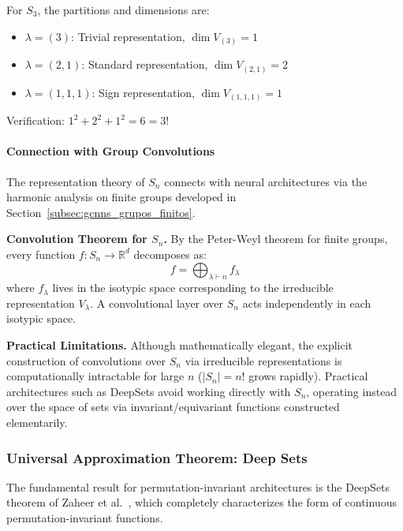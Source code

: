 \begin{example}[Dimensions for $n=3$]
For $S_3$, the partitions and dimensions are:
\begin{itemize}
    \item $\lambda = (3)$: Trivial representation, $\dim V_{(3)} = 1$
    \item $\lambda = (2,1)$: Standard representation, $\dim V_{(2,1)} = 2$
    \item $\lambda = (1,1,1)$: Sign representation, $\dim V_{(1,1,1)} = 1$
\end{itemize}
Verification: $1^2 + 2^2 + 1^2 = 6 = 3!$
\end{example}

\paragraph{Connection with Group Convolutions}

The representation theory of $S_n$ connects with neural architectures via the harmonic analysis on finite groups developed in Section~\ref{subsec:gcnns_grupos_finitos}.

\textbf{Convolution Theorem for $S_n$.}\label{rem:convolution_sn} By the Peter-Weyl theorem for finite groups, every function $f: S_n \to \mathbb{R}^d$ decomposes as:
\begin{equation}
f = \bigoplus_{\lambda \vdash n} f_\lambda
\end{equation}
where $f_\lambda$ lives in the isotypic space corresponding to the irreducible representation $V_\lambda$. A convolutional layer over $S_n$ acts independently in each isotypic space.

\textbf{Practical Limitations.} Although mathematically elegant, the explicit construction of convolutions over $S_n$ via irreducible representations is computationally intractable for large $n$ ($|S_n| = n!$ grows rapidly). Practical architectures such as DeepSets avoid working directly with $S_n$, operating instead over the space of sets via invariant/equivariant functions constructed elementarily.

\subsubsection{Universal Approximation Theorem: Deep Sets}

The fundamental result for permutation-invariant architectures is the DeepSets theorem of Zaheer et al.~\citep{zaheer2017deepsets}, which completely characterizes the form of continuous permutation-invariant functions.

